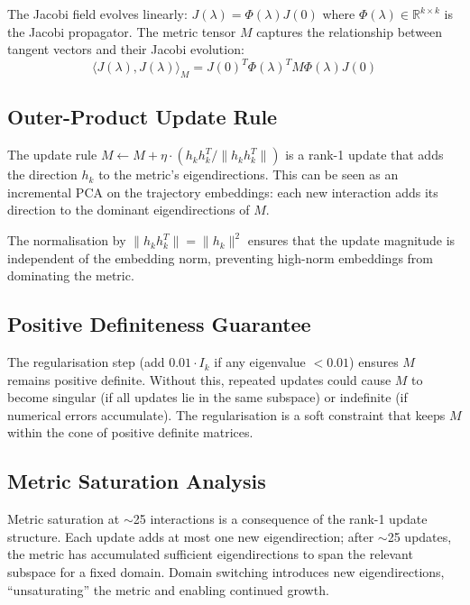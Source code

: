 \documentclass[11pt,a4paper]{article}
\begin{document}
The Jacobi field evolves linearly: $J(\lambda) = \Phi(\lambda) J(0)$ where $\Phi(\lambda) \in \mathbb{R}^{k \times k}$ is the Jacobi propagator. The metric tensor $M$ captures the relationship between tangent vectors and their Jacobi evolution:
\begin{equation}
\langle J(\lambda), J(\lambda) \rangle_M = J(0)^T \Phi(\lambda)^T M \Phi(\lambda) J(0)
\end{equation}

\subsection{Outer-Product Update Rule}

The update rule $M \leftarrow M + \eta \cdot (h_k h_k^T / \|h_k h_k^T\|)$ is a rank-1 update that adds the direction $h_k$ to the metric's eigendirections. This can be seen as an incremental PCA on the trajectory embeddings: each new interaction adds its direction to the dominant eigendirections of $M$.

The normalisation by $\|h_k h_k^T\| = \|h_k\|^2$ ensures that the update magnitude is independent of the embedding norm, preventing high-norm embeddings from dominating the metric.

\subsection{Positive Definiteness Guarantee}

The regularisation step (add $0.01 \cdot I_k$ if any eigenvalue $< 0.01$) ensures $M$ remains positive definite. Without this, repeated updates could cause $M$ to become singular (if all updates lie in the same subspace) or indefinite (if numerical errors accumulate). The regularisation is a soft constraint that keeps $M$ within the cone of positive definite matrices.

\subsection{Metric Saturation Analysis}

Metric saturation at $\sim$25 interactions is a consequence of the rank-1 update structure. Each update adds at most one new eigendirection; after $\sim$25 updates, the metric has accumulated sufficient eigendirections to span the relevant subspace for a fixed domain. Domain switching introduces new eigendirections, ``unsaturating'' the metric and enabling continued growth.
\end{document}
